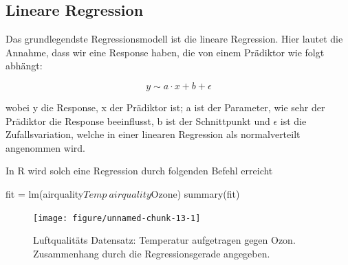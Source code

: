 \documentclass[a4paper,twoside]{tufte-book}\usepackage[]{graphicx}\usepackage[]{color}
\begin{document}
\subsection{Lineare Regression}

Das grundlegendste Regressionsmodell ist die lineare Regression. Hier lautet die Annahme, dass wir eine Response haben, die von einem Prädiktor wie folgt abhängt:

\begin{equation} \label{eq: linear regression}
y \sim a \cdot x + b + \epsilon 
\end{equation}

wobei y die Response, x der Prädiktor ist; a ist der Parameter, wie sehr der Prädiktor die Response beeinflusst, b ist der Schnittpunkt und $\epsilon$ ist die Zufallsvariation, welche in einer linearen Regression als normalverteilt angenommen wird.

In R wird solch eine Regression durch folgenden Befehl erreicht

\begin{Schunk}
\begin{Sinput}
fit = lm(airquality$Temp~airquality$Ozone)
summary(fit)
\end{Sinput}
\end{Schunk}


\begin{figure}[htbp]
\begin{center}
\begin{Schunk}

\texttt{[image: figure/unnamed-chunk-13-1]} \end{Schunk}
\caption{Luftqualitäts Datensatz: Temperatur aufgetragen gegen Ozon. Zusammenhang durch die Regressionsgerade angegeben.}
\label{fig: LR}
\end{center}
\end{figure}
\end{document}
